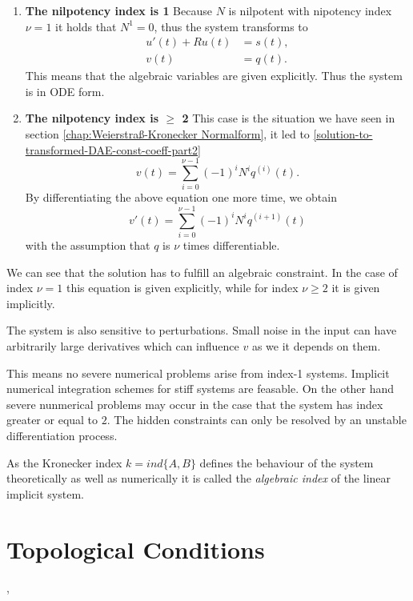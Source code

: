 \begin{enumerate}
	\item \textbf{The nilpotency index is 1} \newline
		Because $N$ is nilpotent with nipotency index $\nu = 1$ it holds that $N^1 = 0$, thus the system transforms to
		\begin{align*}
			u'(t) + Ru(t) &= s(t), \\
			v(t) &= q(t).
		\end{align*}
		This means that the algebraic variables are given explicitly. Thus the system is in ODE form.

	\item \textbf{The nilpotency index is $\geq$ 2} \newline
		This case is the situation we have seen in section \ref{chap:Weierstraß-Kronecker Normalform}, it led to \eqref{solution-to-transformed-DAE-const-coeff-part2}
		\begin{displaymath}
			v(t) = \sum_{i=0}^{\nu-1} (-1)^iN^iq^{(i)}(t).
		\end{displaymath}
		By differentiating the above equation one more time, we obtain
		\begin{equation}
			v'(t) = \sum_{i=0}^{\nu-1} (-1)^iN^iq^{(i+1)}(t)
		\end{equation}
		with the assumption that $q$ is $\nu$ times differentiable.
\end{enumerate}

We can see that the solution has to fulfill an algebraic constraint. In the case of index $\nu = 1$ this equation is given explicitly, while for index $\nu \geq 2$ it is given implicitly.

The system is also sensitive to perturbations. Small noise in the input can have arbitrarily large derivatives which can influence $v$ as we it depends on them.

This means no severe numerical problems arise from index-1 systems. Implicit numerical integration schemes for stiff systems are feasable. On the other hand severe nunmerical problems may occur in the case that the system has index greater or equal to $2$. The hidden constraints can only be resolved by an unstable differentiation process.

As the Kronecker index $k=ind\{A,B\}$ defines the behaviour of the system theoretically as well as numerically it is called the \emph{algebraic index} of the linear implicit system.

\section{Topological Conditions} 
\cite{Tischendorf2005Topological}, %
\cite{ModellingAndDiscretizationOfCircuitProblems}
\cite{DesoerCharlesA1969Bct}


